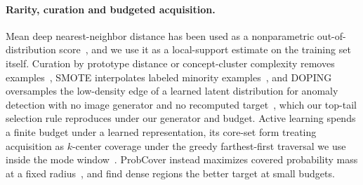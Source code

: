 \documentclass{article}
\begin{document}
\paragraph{Rarity, curation and budgeted acquisition.}
Mean deep nearest-neighbor distance has been used as a nonparametric out-of-distribution score~\citep{sun2022out}, and we use it as a local-support estimate on the training set itself. Curation by prototype distance or concept-cluster complexity removes examples~\citep{sorscher2022beyond,abbas2024effective,whang2023data}, SMOTE interpolates labeled minority examples~\citep{chawla2002smote}, and DOPING oversamples the low-density edge of a learned latent distribution for anomaly detection with no image generator and no recomputed target~\citep{lim2018doping}, which our top-tail selection rule reproduces under our generator and budget. Active learning spends a finite budget under a learned representation, its core-set form treating acquisition as $k$-center coverage under the greedy farthest-first traversal we use inside the mode window~\citep{sener2018active,gonzalez1985clustering}. ProbCover instead maximizes covered probability mass at a fixed radius~\citep{yehuda2022covering}, and \citet{hacohen2022budget} find dense regions the better target at small budgets.
\end{document}
